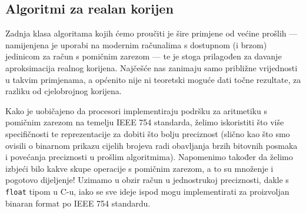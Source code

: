 \documentclass[12pt]{scrartcl}
\begin{document}
\subsection{Algoritmi za realan korijen}
Zadnja klasa algoritama kojih ćemo proučiti je šire primjene od većine prošlih --- namijenjena je uporabi na modernim računalima s dostupnom (i brzom)
jedinicom za račun s pomičnim zarezom --- te je stoga prilagođen za davanje aproksimacija realnog korijena. Najčešće nas zanimaju samo
približne vrijednosti u takvim primjenama, a općenito nije ni teoretski moguće dati točne rezultate, za razliku od cjelobrojnog korijena. 

Kako je uobičajeno da procesori implementiraju podršku za aritmetiku s pomičnim zarezom na temelju
IEEE 754 standarda, želimo iskoristiti što više specifičnosti te reprezentacije za dobiti što bolju preciznost (slično kao što smo ovisili o binarnom
prikazu cijelih brojeva radi obavljanja brzih bitovnih posmaka i povećanja preciznosti u prošlim algoritmima). Napomenimo također da želimo izbjeći
bilo kakve skupe operacije s pomičnim zarezom, a to su množenje i pogotovo dijeljenje! Uzimamo u obzir račun u jednostrukoj preciznosti, dakle s
\texttt{float} tipom u C-u, iako se sve ideje ispod mogu implementirati za proizvoljan binaran format po IEEE 754 standardu.
\end{document}
